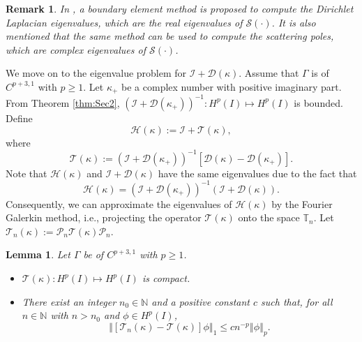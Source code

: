 \documentclass{article}
\newtheorem{lemma}{Lemma}[section]
\newtheorem{remark}{Remark}[section]
\newcommand{\norm}[1]{\left\Vert#1\right\Vert}
\begin{document}
	
	\begin{remark}
		In \cite{SteinbachUnger2012}, a boundary element method is proposed to compute the Dirichlet Laplacian eigenvalues, which are the real eigenvalues of $\mathcal{S}(\cdot)$. It is also mentioned that the same method can be used to compute the scattering poles, which are complex eigenvalues of $\mathcal{S}(\cdot)$. 
	\end{remark}
	
	We move on to the eigenvalue problem for $\mathcal{I}+\mathcal{D}(\kappa)$. Assume that  $\Gamma$ is of $C^{p+3,1}$  with $p\geq1$. Let $\kappa_+$ be a complex number with positive imaginary part. From  Theorem \ref{thm:Sec2}, $(\mathcal{I}+\mathcal{D}(\kappa_+))^{-1}:H^p(I)\mapsto H^p(I)$ is bounded. Define
	\begin{equation*}
		\mathcal{H}(\kappa):=\mathcal{I}+\mathcal{T}(\kappa),
	\end{equation*}
	where
	\begin{equation*}
		\mathcal{T}(\kappa):=(\mathcal{I}+\mathcal{D}(\kappa_+))^{-1}[\mathcal{D}(\kappa)-\mathcal{D}(\kappa_+)].
	\end{equation*}
	Note that  $\mathcal{H}(\kappa)$ and $\mathcal{I}+\mathcal{D}(\kappa)$ have the same eigenvalues due to the fact that
	\[
	\mathcal{H}(\kappa) = (\mathcal{I}+\mathcal{D}(\kappa_+))^{-1}(\mathcal{I}+\mathcal{D}(\kappa)).
	\]
	Consequently, we can approximate the eigenvalues of $\mathcal{H}(\kappa)$ by the Fourier Galerkin method, i.e., projecting the operator $\mathcal{T}(\kappa)$  onto the space $\mathbb{T}_n$. Let $\mathcal{T}_n(\kappa):=\mathcal{P}_n\mathcal{T}(\kappa)\mathcal{P}_n$. 	
	\begin{lemma}\label{sec3:lem3}
		Let $\Gamma$ be of $C^{p+3,1}$  with $p\geq1$. 
		\begin{itemize}
			\item[(1)] $\mathcal{T}(\kappa):H^p(I)\mapsto H^p(I)$ is compact. 
			\item[(2)] There exist an integer $n_0\in\mathbb{N}$ and a positive constant $c$ such that, for all $n\in\mathbb{N}$ with $n>n_0$ and $\phi\in H^{p}(I)$,
           \begin{equation*}\label{convergenceOrderRnE} 
	        \norm{[\mathcal{T}_n(\kappa)-\mathcal{T}(\kappa)]\phi}_{1}\leq c n^{-p}\norm{\phi}_{p}.
          \end{equation*}	
		\end{itemize}
		
	\end{lemma}
	
\end{document}
